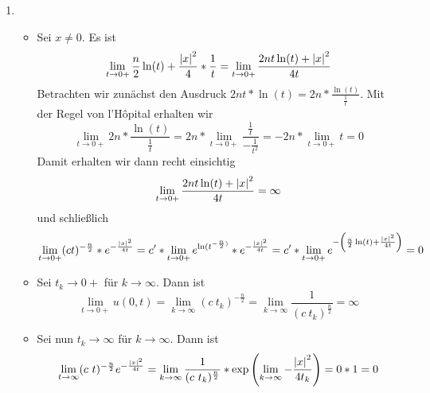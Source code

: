 \begin{exercisePage}
\begin{enumerate}[label=(zu \alph*), leftmargin=*]
		\item \begin{itemize}[leftmargin=*]
			\item Sei $x \neq 0$.
			Es ist
			\begin{equation*}
				\lim\limits_{t \to 0+} \frac{n}{2} \ln(t) + \frac{\left| x \right|^2}{4} * \frac{1}{t} = \lim\limits_{t \to 0+} \frac{2nt \ln(t) + \left| x \right|^2}{4t}
			\end{equation*}
			Betrachten wir zunächst den Ausdruck $2nt * \ln(t) = 2n * \frac{\ln(t)}{\frac{1}{t}}$. Mit der Regel von l'Hôpital erhalten wir
			\begin{equation*}
				\lim_{t \to 0+} 2n * \frac{\ln(t)}{\frac{1}{t}} = 2n * \lim_{t \to 0+} \frac{\frac{1}{t}}{- \frac{1}{t^2}} = -2n * \lim_{t \to 0+} t = 0
			\end{equation*}
			Damit erhalten wir dann recht einsichtig
			\begin{equation*}
				\lim_{t \to 0+} \frac{2nt \ln(t) + \left| x \right|^2}{4t} = \infty
			\end{equation*}
			und schließlich 			
			\begin{equation*}
				\lim_{t \to 0+} (ct)^{-\frac{n}{2}} * e^{-\frac{\left| x \right|^2}{4t}} = c' * \lim_{t \to 0+} e^{\ln(t^{-\frac{n}{2})}} * e^{-\frac{\left| x \right|^2}{4t}} 
				= c' * \lim_{t \to 0+} e^{-\left( \frac{n}{2} \ln(t) + \frac{\left| x \right|^2}{4t} \right)}
				= 0
			\end{equation*}
			
			\item Sei $t_k \to 0+$ für $k \to \infty$. Dann ist 
			\begin{equation*}
				\lim_{t \to 0+} u(0,t) = \lim_{k \to \infty} (c \ t_k)^{- \frac{n}{2}} = \lim_{k \to \infty} \frac{1}{(c \ t_k)^{\frac{n}{2}}} = \infty
			\end{equation*} 
			
			\item Sei nun $t_k \to \infty$ für $k \to \infty$. Dann ist
			\begin{equation*}
				\lim_{t \to \infty} (c \ t)^{- \frac{n}{2}} e^{- \frac{\left| x \right|^2}{4t}} = \lim_{k \to \infty} \frac{1}{(c \ t_k)^{\frac{n}{2}}} * \exp\left( \lim_{k \to \infty} - \frac{\left| x \right|^2}{4t_k} \right) = 0 * 1 = 0
			\end{equation*}
		\end{itemize}
		

\end{enumerate}
\end{exercisePage}
